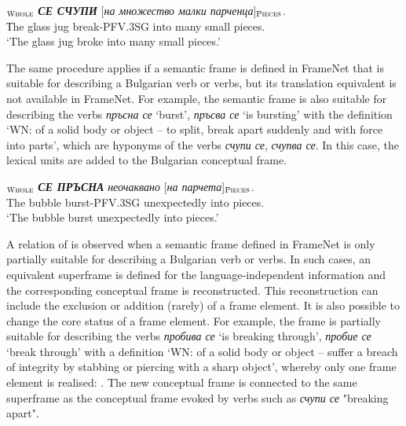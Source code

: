 \documentclass[output=paper,colorlinks,citecolor=brown]{langscibook}
\begin{document}
\begin{exe}
 \ex  \label{ch01:ex:17}
$_{\text{\textsc{Whole}}}$   \textit{\textbf{СЕ СЧУПИ}} [\textit{на множество малки парченца}]$_{\text{\textsc{Pieces}}}$.\\
{Тhe glass jug}  break-PFV.3SG {into many small pieces}. \\
\glt `{The glass jug broke into many small pieces}.'
\end{exe}

The same procedure applies if a semantic frame is defined in FrameNet that is suitable for describing a Bulgarian verb or verbs, but its translation equivalent is not available in FrameNet. For example, the semantic frame  is also suitable for describing the verbs \textit{пръсна се} `burst', \textit{пръсва се} `is bursting' with the definition `WN: of a solid body or object -- to split, break apart suddenly and with force into parts', which are hyponyms of the verbs \textit{счупи се}, \textit{счупва се}. In this case, the lexical units are added to the Bulgarian conceptual frame.

\begin{exe}
 \ex  \label{ch01:ex:18}
$_{\text{\textsc{Whole}}}$   \textit{\textbf{СЕ ПРЪСНА}} \textit{неочаквано} [\textit{на парчета}]$_{\text{\textsc{Pieces}}}$.\\
{The bubble}  burst-PFV.3SG {unexpectedly} {into pieces}. \\
\glt `{The bubble burst unexpectedly into pieces}.'
\end{exe}

A relation of  is observed when a semantic frame defined in FrameNet is only partially suitable for describing a Bulgarian verb or verbs. In such cases, an equivalent superframe is defined for the language-independent information and the corresponding conceptual frame is reconstructed. This reconstruction can include the exclusion or addition (rarely) of a frame element. It is also possible to change the core status of a frame element. For example, the frame  is partially suitable for describing the verbs \textit{пробива се} `is breaking through', \textit{пробие се} `break through' with a definition `WN: of a solid body or object -- suffer a breach of integrity by stabbing or piercing with a sharp object', whereby only one frame element is realised: . The new conceptual frame is connected to the same superframe as the conceptual frame evoked by verbs such as \textit{счупи се} "breaking apart".
\end{document}
